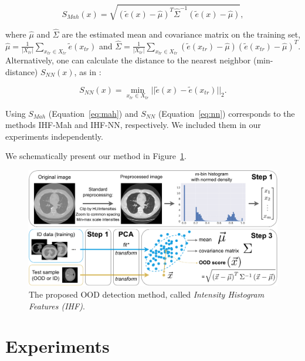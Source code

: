 \begin{equation}
	\label{eq:mah}
	S_{Mah}(x) = \sqrt{ \left( \tilde{e}(x) - \hat{\mu} \right)^T \hat{\Sigma}^{-1} \left( \tilde{e}(x) - \hat{\mu} \right) },
\end{equation}

\noindent
where $\hat{\mu}$ and $\hat{\Sigma}$ are the estimated mean and covariance matrix on the training set, $\hat{\mu} = \frac{1}{|X_{tr}|} \sum_{x_{tr} \in X_{tr}} \tilde{e} \left(x_{tr}\right)$ and $\hat{\Sigma} = \frac{1}{|X_{tr}|} \sum_{x_{tr} \in X_{tr}} \left( \tilde{e} (x_{tr}) - \hat{\mu} \right) \left( \tilde{e} (x_{tr}) - \hat{\mu} \right)^T$. 
Alternatively, one can calculate the distance to the nearest neighbor (min-distance) $S_{NN}(x)$, as in \cite{karimi2022improving}:

\begin{equation}
	\label{eq:nn}
	S_{NN}(x) = \min_{x_{tr} \in X_{tr}} || \tilde{e} (x) - \tilde{e} (x_{tr}) ||_2.
\end{equation}

Using $S_{Mah}$ (Equation~\ref{eq:mah}) and $S_{NN}$ (Equation~\ref{eq:nn}) corresponds to the methods IHF-Mah and IHF-NN, respectively. We included them in our experiments independently.


We schematically present our method in Figure~\ref{fig:ihf}. 

\begin{landscape}
\begin{figure}[p]
	\centering
	\includegraphics[width=\linewidth]{Dissertation/Figures/5_ood_bench/method-1.pdf}
	\caption{The proposed OOD detection method, called \textit{Intensity Histogram Features (IHF)}.}
	\label{fig:ihf}
\end{figure}
\end{landscape}


\section{Experiments}

